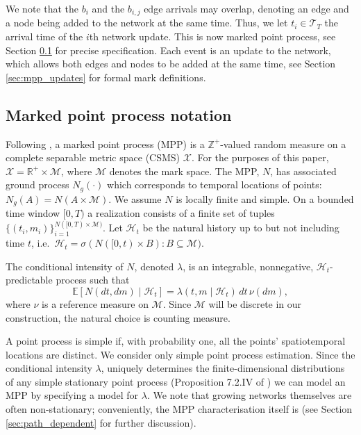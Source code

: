 \documentclass[12pt]{article}
\begin{document}
 We note that the $b_i$ and the $b_{i,j}$ edge arrivals may overlap, denoting an edge and a node being added to the network at the same time. Thus, we let $t_i \in \mathcal{T}_{T}$ the arrival time of the $i$th network update. This is now marked point process, see Section \ref{sec:mpp_notation} for precise specification. Each event is an update to the network, which allows both edges and nodes to be added at the same time, see Section \ref{sec:mpp_updates} for formal mark definitions.

\subsection{Marked point process notation}\label{sec:mpp_notation}

Following \citep{daley2007introduction}, a marked point process (MPP) is a $\mathbb{Z}^+$-valued random measure on a complete separable metric space (CSMS) $\mathcal X$. For the purposes of this paper, $\mathcal X=\mathbb{R}^+\times\mathcal{M}$, where $\mathcal{M}$ denotes the mark space. The MPP, $N$, has associated ground process $N_g(\cdot)$ which corresponds to temporal locations of points: $N_g(A)=N(A\times\mathcal M)$. We assume $N$ is locally finite and simple. On a bounded time window $[0,T)$ a realization consists of a finite set of tuples $\{(t_i,m_i)\}_{i=1}^{N([0,T)\times \mathcal M)}$. Let $\mathcal H_t$ be the natural history up to but not including time $t$, i.e.\ $\mathcal H_t=\sigma(N([0,t)\times B):B\subseteq \mathcal M)$.

The conditional intensity of $N$, denoted $\lambda$, is an integrable, nonnegative, $\mathcal{H}_t$-predictable process such that
\[
\mathbb{E}[N(dt,dm)\mid\mathcal H_t]=\lambda(t,m\mid\mathcal H_t)\,dt\,\nu(dm),
\]
where $\nu$ is a reference measure on $\mathcal M$. Since $\mathcal M$ will be discrete in our construction, the natural choice is counting measure.

 A point process is simple if, with probability one, all the points' spatiotemporal locations are distinct. We consider only simple point process estimation. Since the conditional intensity $\lambda$, uniquely determines the finite-dimensional distributions of any simple stationary point process (Proposition 7.2.IV of \cite{daley2003introduction}) we can model an MPP by specifying a model for $\lambda$. We note that growing networks themselves are often non-stationary; conveniently, the MPP characterisation itself is (see Section \ref{sec:path_dependent} for further discussion). 
\end{document}
